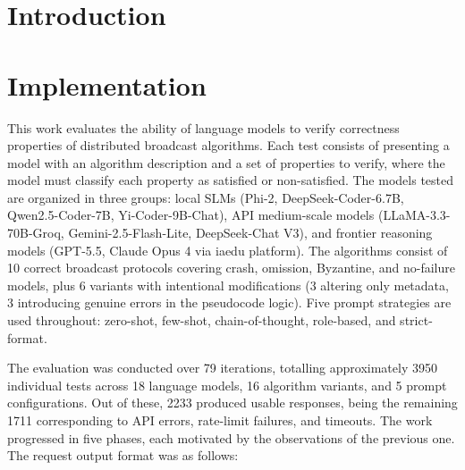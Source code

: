 \documentclass[conference]{IEEEtran}
\begin{document}

\begin{abstract}

\end{abstract}


\begin{IEEEkeywords}

\end{IEEEkeywords}


\section{Introduction}


\section{Implementation}

This work evaluates the ability of language models to verify correctness properties of distributed broadcast algorithms. Each test consists of presenting a model with an algorithm description and a set of properties to verify, where the model must classify each property as satisfied or non-satisfied. The models tested are organized in three groups: local SLMs (Phi-2, DeepSeek-Coder-6.7B, Qwen2.5-Coder-7B, Yi-Coder-9B-Chat), API medium-scale models (LLaMA-3.3-70B-Groq, Gemini-2.5-Flash-Lite, DeepSeek-Chat V3), and frontier reasoning models (GPT-5.5, Claude Opus 4 via iaedu platform). The algorithms consist of 10 correct broadcast protocols covering crash, omission, Byzantine, and no-failure models, plus 6 variants with intentional modifications (3 altering only metadata, 3 introducing genuine errors in the pseudocode logic). Five prompt strategies are used throughout: zero-shot, few-shot, chain-of-thought, role-based, and strict-format.

The evaluation was conducted over 79 iterations, totalling approximately 3950 individual tests across 18 language models, 16 algorithm variants, and 5 prompt configurations. Out of these, 2233 produced usable responses, being the remaining 1711 corresponding to API errors, rate-limit failures, and timeouts. The work progressed in five phases, each motivated by the observations of the previous one. The request output format was as follows: 
\end{document}
